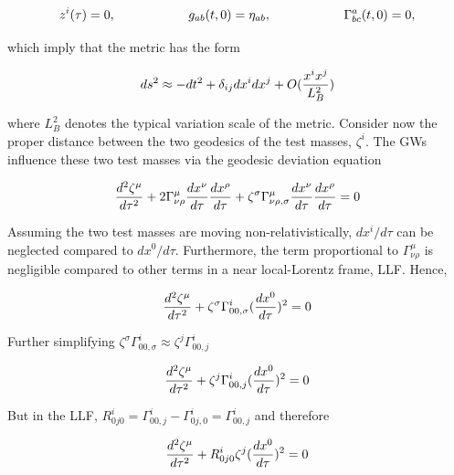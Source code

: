 \documentclass[binding=0.6cm, LaM]{sapthesis}
\begin{document}
		\begin{equation}
		z^i(\tau) = 0, \hspace*{2cm} g_{ab}(t, 0) = \eta_{ab}, \hspace*{2cm} \Gamma^a_{bc}(t,0) = 0,
		\end{equation}

	which imply that the metric has the form

		\begin{equation}
		ds^2 \approx -dt^2 + \delta_{ij}dx^i dx^j + O({{x^ix^j}\over{L^2_B}})
		\end{equation}

	where $L^2_B$ denotes the typical variation scale of the metric.
	Consider now the proper distance between the two geodesics of the test masses, $\zeta^i$. 
	The GWs influence these two test masses via the geodesic deviation equation

		\begin{equation}
		{{d^2\zeta^{\mu}}\over{d\tau^2}} + 2\Gamma^{\mu}_{\nu\rho}{{dx^{\nu}}\over{d\tau}}{{dx^\rho}\over{d\tau}} + \zeta^{\sigma}\Gamma^{\mu}_{\nu\rho,\sigma}{{dx^{\nu}}\over{d\tau}}{{dx^{\rho}}\over{d\tau}} = 0
		\end{equation}

	Assuming the two test masses are moving non-relativistically, $dx^i/d\tau$ can be neglected compared to $dx^0/d\tau$.
	Furthermore, the term proportional to $\Gamma^{\mu}_{\nu\rho}$ is negligible compared to other terms in a near  local-Lorentz frame, LLF. Hence,

		\begin{equation}
		{{d^2\zeta^{\mu}}\over{d\tau^2}} + \zeta^{\sigma}\Gamma^{i}_{00, \sigma}({{dx^0}\over{d\tau}})^2 = 0
		\end{equation}

	Further simplifying $\zeta^{\sigma}\Gamma^{i}_{00, \sigma} \approx \zeta^{j}\Gamma^{i}_{00, j}$

		\begin{equation}
		{{d^2\zeta^{\mu}}\over{d\tau^2}} + \zeta^{j}\Gamma^{i}_{00,j}({{dx^0}\over{d\tau}})^2 = 0
		\end{equation}

	But in the LLF, $R^i_{0j0} = \Gamma^i_{00,j} - \Gamma^i_{0j,0} = \Gamma^i_{00,j}$ and therefore

		\begin{equation}
		{{d^2\zeta^{\mu}}\over{d\tau^2}} + R^i_{0j0} \zeta^j({{dx^0}\over{d\tau}})^2 = 0
		\end{equation}
\end{document}

